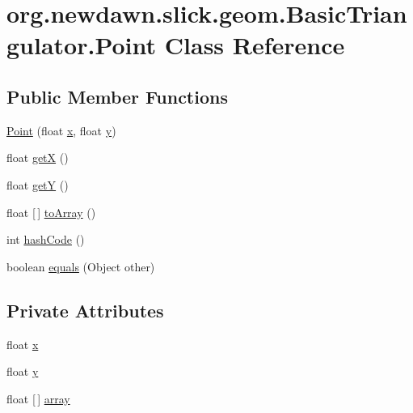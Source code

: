 \hypertarget{classorg_1_1newdawn_1_1slick_1_1geom_1_1_basic_triangulator_1_1_point}{}\section{org.\+newdawn.\+slick.\+geom.\+Basic\+Triangulator.\+Point Class Reference}
\label{classorg_1_1newdawn_1_1slick_1_1geom_1_1_basic_triangulator_1_1_point}
\subsection*{Public Member Functions}
\begin{DoxyCompactItemize}
\item 
\mbox{\hyperlink{classorg_1_1newdawn_1_1slick_1_1geom_1_1_basic_triangulator_1_1_point_aece21dc99059c02dceef8a70eb47d4cc}{Point}} (float \mbox{\hyperlink{classorg_1_1newdawn_1_1slick_1_1geom_1_1_basic_triangulator_1_1_point_a430d2074970ce9d8248e998f45e0deac}{x}}, float \mbox{\hyperlink{classorg_1_1newdawn_1_1slick_1_1geom_1_1_basic_triangulator_1_1_point_aad601993c7f613bd1e26c48a62a950d7}{y}})
\item 
float \mbox{\hyperlink{classorg_1_1newdawn_1_1slick_1_1geom_1_1_basic_triangulator_1_1_point_aeaef6b66057505fbb785e9e0bee90c25}{getX}} ()
\item 
float \mbox{\hyperlink{classorg_1_1newdawn_1_1slick_1_1geom_1_1_basic_triangulator_1_1_point_a489a862ca5103c6ba00bcf5f9f1a1507}{getY}} ()
\item 
float \mbox{[}$\,$\mbox{]} \mbox{\hyperlink{classorg_1_1newdawn_1_1slick_1_1geom_1_1_basic_triangulator_1_1_point_acb4b7fb3bab66540d7cad1c662415c56}{to\+Array}} ()
\item 
int \mbox{\hyperlink{classorg_1_1newdawn_1_1slick_1_1geom_1_1_basic_triangulator_1_1_point_a5c488f1e1930c32836c688375616450a}{hash\+Code}} ()
\item 
boolean \mbox{\hyperlink{classorg_1_1newdawn_1_1slick_1_1geom_1_1_basic_triangulator_1_1_point_ac04a7b88ef5fa9160ca9f146e9585791}{equals}} (Object other)
\end{DoxyCompactItemize}
\subsection*{Private Attributes}
\begin{DoxyCompactItemize}
\item 
float \mbox{\hyperlink{classorg_1_1newdawn_1_1slick_1_1geom_1_1_basic_triangulator_1_1_point_a430d2074970ce9d8248e998f45e0deac}{x}}
\item 
float \mbox{\hyperlink{classorg_1_1newdawn_1_1slick_1_1geom_1_1_basic_triangulator_1_1_point_aad601993c7f613bd1e26c48a62a950d7}{y}}
\item 
float \mbox{[}$\,$\mbox{]} \mbox{\hyperlink{classorg_1_1newdawn_1_1slick_1_1geom_1_1_basic_triangulator_1_1_point_a029a72bfc3c624500744d9650e06aa77}{array}}
\end{DoxyCompactItemize}


